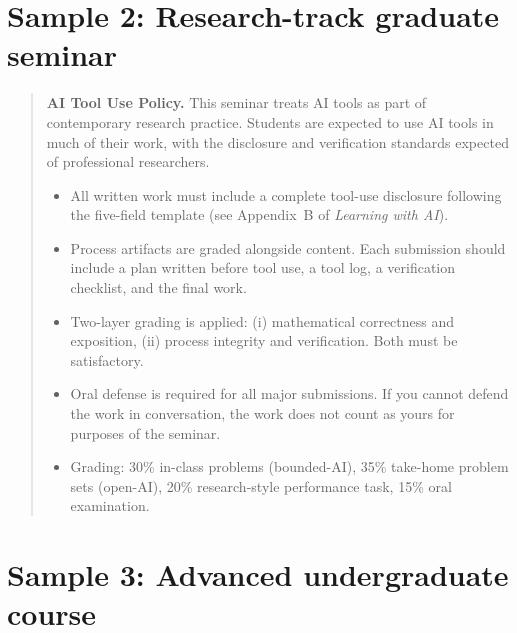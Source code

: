 \documentclass[11pt]{book}
\begin{document}
\section*{Sample 2: Research-track graduate seminar}

\medskip

\begin{quote}
\textbf{AI Tool Use Policy.} This seminar treats AI tools as part of contemporary research practice. Students are expected to use AI tools in much of their work, with the disclosure and verification standards expected of professional researchers.

\begin{itemize}\setlength{\itemsep}{2pt}
\item All written work must include a complete tool-use disclosure following the five-field template (see Appendix~B of \emph{Learning with AI}).
\item Process artifacts are graded alongside content. Each submission should include a plan written before tool use, a tool log, a verification checklist, and the final work.
\item Two-layer grading is applied: (i) mathematical correctness and exposition, (ii) process integrity and verification. Both must be satisfactory.
\item Oral defense is required for all major submissions. If you cannot defend the work in conversation, the work does not count as yours for purposes of the seminar.
\item Grading: 30\% in-class problems (bounded-AI), 35\% take-home problem sets (open-AI), 20\% research-style performance task, 15\% oral examination.
\end{itemize}
\end{quote}

\section*{Sample 3: Advanced undergraduate course}

\medskip
\end{document}
